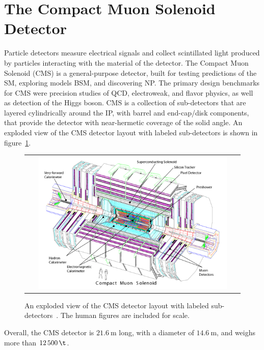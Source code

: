 \section{The Compact Muon Solenoid Detector}
Particle detectors measure electrical signals and collect scintillated light produced by particles interacting with the material of the detector.
The Compact Muon Solenoid (CMS) is a general-purpose detector, built for testing predictions of the SM, exploring models BSM, and discovering NP.
The primary design benchmarks for CMS were precision studies of QCD, electroweak, and flavor physics, as well as detection of the Higgs boson.
CMS is a collection of sub-detectors that are layered cylindrically around the IP, with barrel and end-cap/disk components, that provide the detector with near-hermetic coverage of the solid angle.
An exploded view of the CMS detector layout with labeled sub-detectors is shown in figure~\ref{CMS_Detector}.
\begin{figure}[htb]
  \begin{center}
    \begin{tabular}{c}
        \includegraphics[width=0.9\textwidth]{fig_LHC_CMS/CMS_Detector.pdf}
    \end{tabular}
    \caption{An exploded view of the CMS detector layout with labeled sub-detectors~\cite{Bayatian:922757}.
            The human figures are included for scale.
            }
    \label{CMS_Detector}
  \end{center}
\end{figure}
Overall, the CMS detector is $\SI{21.6}{\m}$ long, with a diameter of $\SI{14.6}{\m}$, and weighs more than $\SI{12500}{\t}$.

